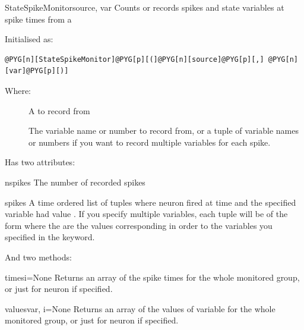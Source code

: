 \documentclass[letterpaper,10pt,english]{manual}
\begin{document}
\hypertarget{brian.StateSpikeMonitor}{}\begin{classdesc}{StateSpikeMonitor}{source, var}
Counts or records spikes and state variables at spike times from a \hyperlink{brian.NeuronGroup}{}

Initialised as:

\begin{Verbatim}[commandchars=@\[\]]
@PYG[n][StateSpikeMonitor]@PYG[p][(]@PYG[n][source]@PYG[p][,] @PYG[n][var]@PYG[p][)]
\end{Verbatim}

Where:
\begin{description}
\item[] \leavevmode
A \hyperlink{brian.NeuronGroup}{} to record from

\item[] \leavevmode
The variable name or number to record from, or a tuple of variable names or numbers
if you want to record multiple variables for each spike.

\end{description}

Has two attributes:

\hypertarget{brian.StateSpikeMonitor.nspikes}{}\begin{memberdesc}{nspikes}
The number of recorded spikes
\end{memberdesc}

\hypertarget{brian.StateSpikeMonitor.spikes}{}\begin{memberdesc}{spikes}
A time ordered list of tuples  where neuron  fired
at time  and the specified variable had value . If you
specify multiple variables, each tuple will be of the form
 where the  are the values corresponding
in order to the variables you specified in the  keyword.
\end{memberdesc}

And two methods:

\hypertarget{brian.StateSpikeMonitor.times}{}\begin{methoddesc}{times}{i=None}
Returns an array of the spike times for the whole monitored
group, or just for neuron  if specified.
\end{methoddesc}

\hypertarget{brian.StateSpikeMonitor.values}{}\begin{methoddesc}{values}{var, i=None}
Returns an array of the values of variable  for the
whole monitored group, or just for neuron  if specified.
\end{methoddesc}
\end{classdesc}
\end{document}
